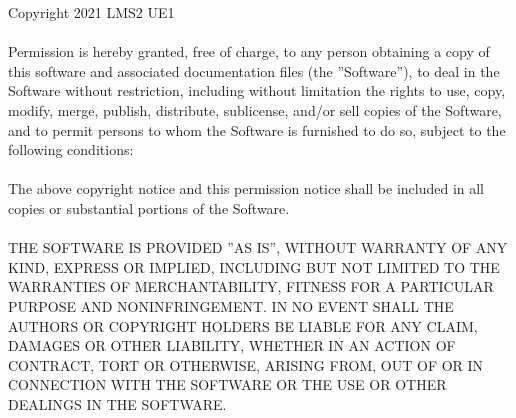 Copyright 2021 LMS2 UE1
\\\\
Permission is hereby granted,  free of charge,  to any person obtaining a copy of this software and associated documentation files (the ''Software''), to deal in the Software without restriction,  including without limitation the rights to use, copy, modify, merge, publish, distribute, sublicense, and/or sell copies of the Software,  and to permit persons to whom the Software is furnished to do so,  subject to the following conditions:
\\\\
The above copyright notice and this permission notice shall be included in all copies or substantial portions of the Software.
\\\\
THE SOFTWARE IS PROVIDED ''AS IS'', WITHOUT WARRANTY OF ANY KIND, EXPRESS OR IMPLIED, INCLUDING BUT NOT LIMITED TO THE WARRANTIES OF MERCHANTABILITY, FITNESS FOR A PARTICULAR PURPOSE AND NONINFRINGEMENT. IN NO EVENT SHALL THE AUTHORS OR COPYRIGHT HOLDERS BE LIABLE FOR ANY CLAIM, DAMAGES OR OTHER LIABILITY, WHETHER IN AN ACTION OF CONTRACT, TORT OR OTHERWISE, ARISING FROM, OUT OF OR IN CONNECTION WITH THE SOFTWARE OR THE USE OR OTHER DEALINGS IN THE SOFTWARE.
